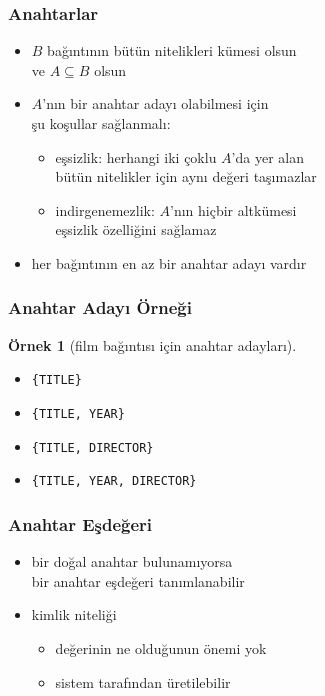 \documentclass[dvipsnames]{beamer}
\theoremstyle{definition}
\theoremstyle{example}
\newtheorem{ornek}[theorem]{Örnek}
\theoremstyle{plain}
\begin{document}
\begin{frame}
  \frametitle{Anahtarlar}

  \begin{itemize}
    \item $B$ bağıntının bütün nitelikleri kümesi olsun\\
      ve $A \subseteq B$ olsun

    \item $A$'nın bir anahtar adayı olabilmesi için\\
      şu koşullar sağlanmalı:

    \pause
    \begin{itemize}
      \item \alert{eşsizlik}: herhangi iki çoklu $A$'da yer alan\\
        bütün nitelikler için aynı değeri taşımazlar

      \pause
      \item \alert{indirgenemezlik}: $A$'nın hiçbir altkümesi\\
        eşsizlik özelliğini sağlamaz
    \end{itemize}

    \pause
    \item her bağıntının en az bir anahtar adayı vardır
  \end{itemize}
\end{frame}

\begin{frame}
  \frametitle{Anahtar Adayı Örneği}

  \begin{ornek}[film bağıntısı için anahtar adayları]
    \begin{itemize}
      \item \texttt{\{TITLE\}}

      \pause
      \item \texttt{\{TITLE, YEAR\}}

      \pause
      \item \texttt{\{TITLE, DIRECTOR\}}

      \pause
      \item \texttt{\{TITLE, YEAR, DIRECTOR\}}
    \end{itemize}
  \end{ornek}
\end{frame}

\begin{frame}
  \frametitle{Anahtar Eşdeğeri}

  \begin{itemize}
    \item bir \alert{doğal anahtar} bulunamıyorsa\\
      bir \alert{anahtar eşdeğeri} tanımlanabilir

    \pause
    \medskip
    \item kimlik niteliği
    \begin{itemize}
      \item değerinin ne olduğunun önemi yok
      \item sistem tarafından üretilebilir
    \end{itemize}
  \end{itemize}
\end{frame}
\end{document}

